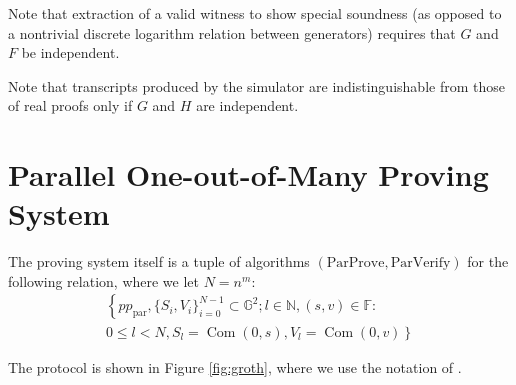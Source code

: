 \documentclass{llncs}
\newcommand{\G}{\mathbb{G}}
\newcommand{\F}{\mathbb{F}}
\newcommand{\com}{\operatorname{Com}}
\begin{document}
\begin{remark}
Note that extraction of a valid witness to show special soundness (as opposed to a nontrivial discrete logarithm relation between generators) requires that $G$ and $F$ be independent.
\end{remark}

\begin{remark}
Note that transcripts produced by the simulator are indistinguishable from those of real proofs only if $G$ and $H$ are independent.
\end{remark}


\section{Parallel One-out-of-Many Proving System}
\label{app:parallel}

The proving system itself is a tuple of algorithms $(\text{ParProve},\text{ParVerify})$ for the following relation, where we let $N = n^m$:
\begin{multline*}
\left\{ pp_{\text{par}}, \{S_i,V_i\}_{i=0}^{N-1} \subset \G^2 ; l \in \mathbb{N}, (s,v) \in \F : \right. \\
\left. 0 \leq l < N, S_l = \com(0,s), V_l = \com(0,v) \right\}
\end{multline*}

The protocol is shown in Figure \ref{fig:groth}, where we use the notation of \cite{lelantus}.
\end{document}
